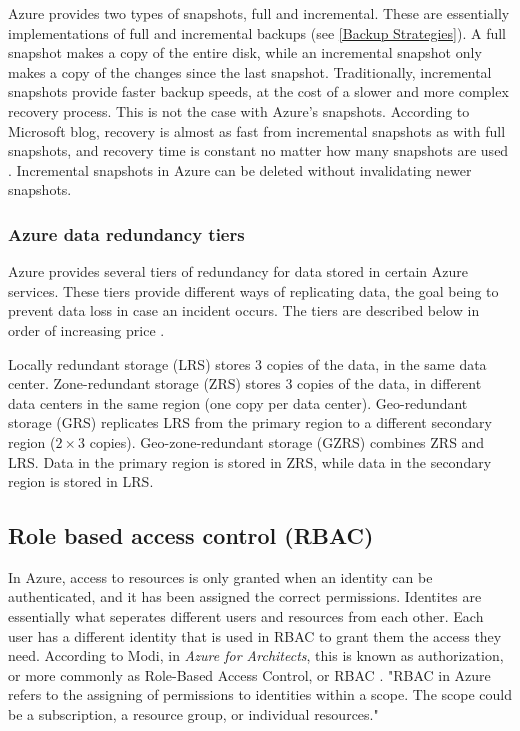 Azure provides two types of snapshots, full and incremental.
These are essentially implementations of full and incremental backups (see \ref{Backup Strategies}).
A full snapshot makes a copy of the entire disk, 
while an incremental snapshot only makes a copy of the changes since the last snapshot.
Traditionally, incremental snapshots provide faster backup speeds, 
at the cost of a slower and more complex recovery process.
This is not the case with Azure's snapshots.
According to Microsoft blog, 
recovery is almost as fast from incremental snapshots as with full snapshots,
and recovery time is constant no matter how many snapshots are used
\cite{noauthor_incremental_nodate}.
Incremental snapshots in Azure can be deleted without invalidating newer snapshots.

\subsubsection{Azure data redundancy tiers} \label{theory:redundancy-tiers}

Azure provides several tiers of redundancy for data stored in certain Azure services.
These tiers provide different ways of replicating data,
the goal being to prevent data loss in case an incident occurs.
The tiers are described below in order of increasing price \cite{tamram_data_nodate}.

Locally redundant storage (LRS) stores 3 copies of the data, in the same data center.
Zone-redundant storage (ZRS) stores 3 copies of the data, in different data centers in the same region (one copy per data center).
Geo-redundant storage (GRS) replicates LRS from the primary region to a different secondary region ($2 \times 3$ copies).
Geo-zone-redundant storage (GZRS) combines ZRS and LRS. Data in the primary region is stored in ZRS, while data in the secondary region is stored in LRS.

\subsection{Role based access control (RBAC)} \label{theory:RBAC}
In Azure, access to resources is only granted when an identity can be authenticated, 
and it has been assigned the correct permissions. Identites are essentially what seperates different users and resources from each other. Each user has a different identity that is used in RBAC to grant them the access they need. 
According to Modi, in \textit{Azure for Architects}, this is known as authorization, or more commonly as Role-Based Access Control, or RBAC \cite{modi_azure_2019}.
"RBAC in Azure refers to the assigning of permissions to identities within a scope. 
The scope could be a subscription, a resource group, or individual resources."

